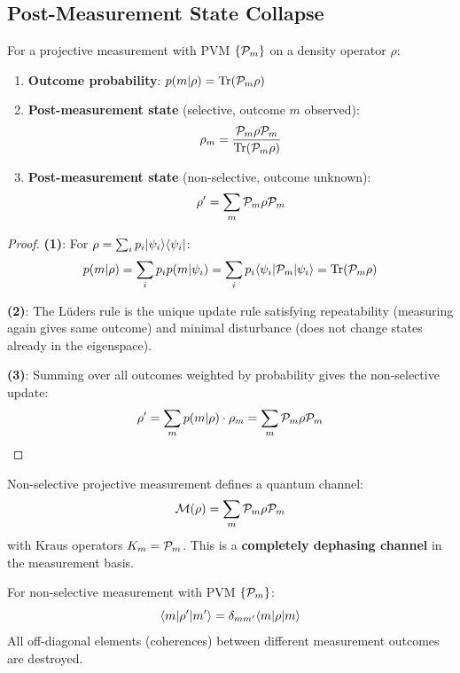 \subsection{Post-Measurement State Collapse}

\begin{theorem}
\label{thm:luders}
For a projective measurement with PVM $\{\mathcal{P}_m\}$ on a density operator $\rho$:
\begin{enumerate}
  \item \textbf{Outcome probability}: $p(m|\rho) = \mathrm{Tr}(\mathcal{P}_m \rho)$

  \item \textbf{Post-measurement state} (selective, outcome $m$ observed):
  \[
  \rho_m = \frac{\mathcal{P}_m \rho \mathcal{P}_m}{\mathrm{Tr}(\mathcal{P}_m \rho)}
  \]

  \item \textbf{Post-measurement state} (non-selective, outcome unknown):
  \[
  \rho' = \sum_m \mathcal{P}_m \rho \mathcal{P}_m
  \]
\end{enumerate}
\end{theorem}

\begin{proof}
\textbf{(1)}: For $\rho = \sum_i p_i |\psi_i\rangle\langle \psi_i|$:
\[
p(m|\rho) = \sum_i p_i p(m|\psi_i) = \sum_i p_i \langle \psi_i|\mathcal{P}_m|\psi_i\rangle = \mathrm{Tr}(\mathcal{P}_m \rho)
\]

\textbf{(2)}: The L\"uders rule is the unique update rule satisfying repeatability (measuring again gives same outcome) and minimal disturbance (does not change states already in the eigenspace).

\textbf{(3)}: Summing over all outcomes weighted by probability gives the non-selective update:
\[
\rho' = \sum_m p(m|\rho) \cdot \rho_m = \sum_m \mathcal{P}_m \rho \mathcal{P}_m
\]
\end{proof}

\begin{corollary}
\label{cor:measurement-channel}
Non-selective projective measurement defines a quantum channel:
\[
\mathcal{M}(\rho) = \sum_m \mathcal{P}_m \rho \mathcal{P}_m
\]
with Kraus operators $K_m = \mathcal{P}_m$. This is a \textbf{completely dephasing channel} in the measurement basis.
\end{corollary}

\begin{proposition}
\label{prop:measurement-coherence}
For non-selective measurement with PVM $\{\mathcal{P}_m\}$:
\[
\langle m|\rho'|m'\rangle = \delta_{mm'} \langle m|\rho|m\rangle
\]
All off-diagonal elements (coherences) between different measurement outcomes are destroyed.
\end{proposition}

